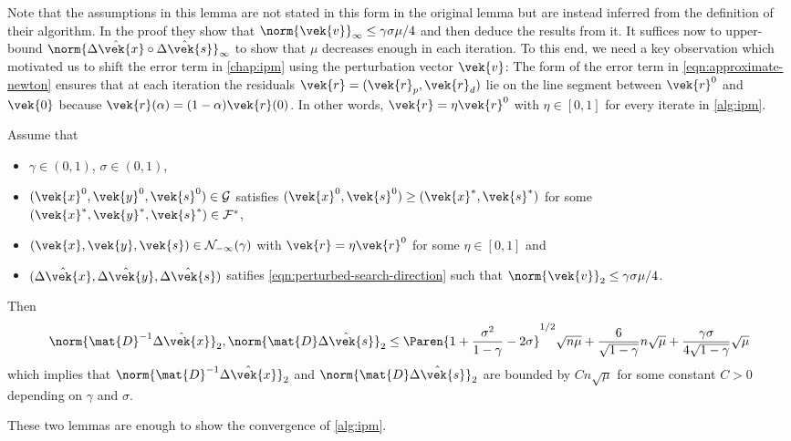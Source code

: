 Note that the assumptions in this lemma are not stated in this form in the original lemma but are instead inferred from the definition of their algorithm.
In the proof they show that \(\norm{\vek{v}}_\infty \leq \gamma \sigma \mu / 4\) and then deduce the results from it.
It suffices now to upper-bound \(\norm{\hat{\Delta\vek{x}} \circ \hat{\Delta\vek{s}}}_\infty\) to show that \(\mu\) decreases enough in each iteration.
To this end, we need a key observation which motivated us to shift the error term in \cref{chap:ipm} using the perturbation vector \(\vek{v}\):
The form of the error term in \cref{eqn:approximate-newton} ensures that at each iteration the residuals \(\vek{r} = (\vek{r}_p, \vek{r}_d)\) lie on the line segment between \(\vek{r}^0\) and \(\vek{0}\)
because \(\vek{r}(\alpha) = (1 - \alpha) \vek{r}(0)\).
In other words, \(\vek{r} = \eta \vek{r}^0\) with \(\eta \in [0, 1]\) for every iterate in \cref{alg:ipm}.

\begin{lemma}\label{thm:delta-x-s-bound}
  Assume that
  \begin{itemize}
    \item \(\gamma \in (0, 1)\), \(\sigma \in (0, 1)\), 
    \item \((\vek{x}^0, \vek{y}^0, \vek{s}^0) \in \mathcal{G}\) satisfies \((\vek{x}^0, \vek{s}^0) \geq (\vek{x}^*, \vek{s}^*)\) for some \((\vek{x}^*, \vek{y}^*, \vek{s}^*) \in \mathcal{F}^*\), 
    \item \((\vek{x}, \vek{y}, \vek{s}) \in \mathcal{N}_{-\infty}(\gamma)\) with \(\vek{r} = \eta \vek{r}^0\) for some \(\eta \in [0, 1]\) and
    \item \((\hat{\Delta\vek{x}}, \hat{\Delta\vek{y}}, \hat{\Delta\vek{s}})\) satifies \cref{eqn:perturbed-search-direction} such that \(\norm{\vek{v}}_2 \leq \gamma \sigma \mu / 4\).
  \end{itemize}
  Then
  \[ \norm{\mat{D}^{-1}\hat{\Delta\vek{x}}}_2, \norm{\mat{D}\hat{\Delta\vek{s}}}_2 \leq \Paren{1 + \frac{\sigma^2}{1- \gamma} - 2\sigma}^{1/2} \sqrt{n \mu} + \frac{6}{\sqrt{1 - \gamma}} n\sqrt{\mu} + \frac{\gamma \sigma}{4 \sqrt{1 - \gamma}}\sqrt{\mu}\]
  which implies that \(\norm{\mat{D}^{-1}\hat{\Delta\vek{x}}}_2\) and \(\norm{\mat{D}\hat{\Delta\vek{s}}}_2\) are bounded by \(C n \sqrt{\mu}\) for some constant \(C > 0\) depending on \(\gamma\) and \(\sigma\).
\end{lemma}

These two lemmas are enough to show the convergence of \cref{alg:ipm}.

